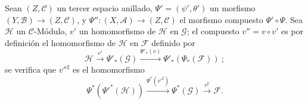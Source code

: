 \begin{env}[4.4.8]
\label{0.4.4.8-fr}
Sean $(Z,\mathcal{C})$ un tercer espacio anillado,
$\Psi'=(\psi',\theta')$ un morfismo $(Y,\mathcal{B})\to(Z,\mathcal{C})$, y
$\Psi'':(X,\mathcal{A})\to(Z,\mathcal{C})$ el morfismo compuesto
$\Psi'\circ\Psi$. Sea $\mathcal{H}$ un $\mathcal{C}$-Módulo, $v'$ un
homomorfismo de $\mathcal{H}$ en $\mathcal{G}$; el compuesto
$v''=v\circ v'$ es por definición el homomorfismo de $\mathcal{H}$ en
$\mathcal{F}$ definido por
\[
  \mathcal{H}\xrightarrow{v'}\Psi'_*(\mathcal{G})
  \xrightarrow{\Psi'_*(v)}\Psi'_*(\Psi_*(\mathcal{F}))~;
\]
se verifica que ${v''}^\sharp$ es el homomorfismo
\[
  \Psi^*({\Psi'}^*(\mathcal{H}))
  \xrightarrow{\Psi^*({v'}^\sharp)}
  \Psi^*(\mathcal{G})
  \xrightarrow{v^\sharp}\mathcal{F}.
\]
\end{env}

